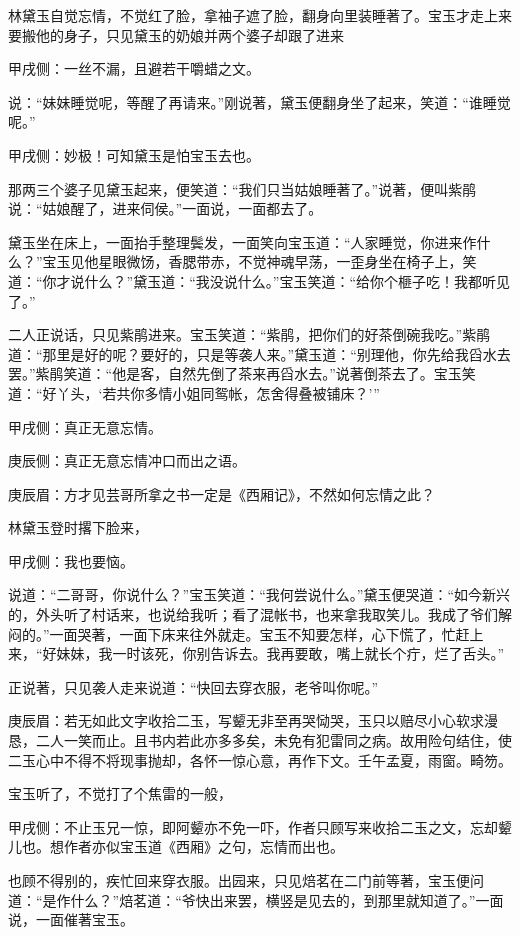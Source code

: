 \begin{parag}
    林黛玉自觉忘情，不觉红了脸，拿袖子遮了脸，翻身向里装睡著了。宝玉才走上来要搬他的身子，只见黛玉的奶娘并两个婆子却跟了进来\begin{note}甲戌侧：一丝不漏，且避若干嚼蜡之文。\end{note}说：“妹妹睡觉呢，等醒了再请来。”刚说著，黛玉便翻身坐了起来，笑道：“谁睡觉呢。”\begin{note}甲戌侧：妙极！可知黛玉是怕宝玉去也。\end{note}那两三个婆子见黛玉起来，便笑道：“我们只当姑娘睡著了。”说著，便叫紫鹃说：“姑娘醒了，进来伺侯。”一面说，一面都去了。
\end{parag}


\begin{parag}
    黛玉坐在床上，一面抬手整理鬓发，一面笑向宝玉道：“人家睡觉，你进来作什么？”宝玉见他星眼微饧，香腮带赤，不觉神魂早荡，一歪身坐在椅子上，笑道：“你才说什么？”黛玉道：“我没说什么。”宝玉笑道：“给你个榧子吃！我都听见了。”
\end{parag}


\begin{parag}
    二人正说话，只见紫鹃进来。宝玉笑道：“紫鹃，把你们的好茶倒碗我吃。”紫鹃道：“那里是好的呢？要好的，只是等袭人来。”黛玉道：“别理他，你先给我舀水去罢。”紫鹃笑道：“他是客，自然先倒了茶来再舀水去。”说著倒茶去了。宝玉笑道：“好丫头，‘若共你多情小姐同鸳帐，怎舍得叠被铺床？’”\begin{note}甲戌侧：真正无意忘情。\end{note}\begin{note}庚辰侧：真正无意忘情冲口而出之语。\end{note}\begin{note}庚辰眉：方才见芸哥所拿之书一定是《西厢记》，不然如何忘情之此？\end{note}林黛玉登时撂下脸来，\begin{note}甲戌侧：我也要恼。\end{note}说道：“二哥哥，你说什么？”宝玉笑道：“我何尝说什么。”黛玉便哭道：“如今新兴的，外头听了村话来，也说给我听；看了混帐书，也来拿我取笑儿。我成了爷们解闷的。”一面哭著，一面下床来往外就走。宝玉不知要怎样，心下慌了，忙赶上来，“好妹妹，我一时该死，你别告诉去。我再要敢，嘴上就长个疔，烂了舌头。”
\end{parag}


\begin{parag}
    正说著，只见袭人走来说道：“快回去穿衣服，老爷叫你呢。”\begin{note}庚辰眉：若无如此文字收拾二玉，写颦无非至再哭恸哭，玉只以赔尽小心软求漫恳，二人一笑而止。且书内若此亦多多矣，未免有犯雷同之病。故用险句结住，使二玉心中不得不将现事抛却，各怀一惊心意，再作下文。壬午孟夏，雨窗。畸笏。\end{note}宝玉听了，不觉打了个焦雷的一般，\begin{note}甲戌侧：不止玉兄一惊，即阿颦亦不免一吓，作者只顾写来收拾二玉之文，忘却颦儿也。想作者亦似宝玉道《西厢》之句，忘情而出也。\end{note}也顾不得别的，疾忙回来穿衣服。出园来，只见焙茗在二门前等著，宝玉便问道：“是作什么？”焙茗道：“爷快出来罢，横竖是见去的，到那里就知道了。”一面说，一面催著宝玉。
\end{parag}


